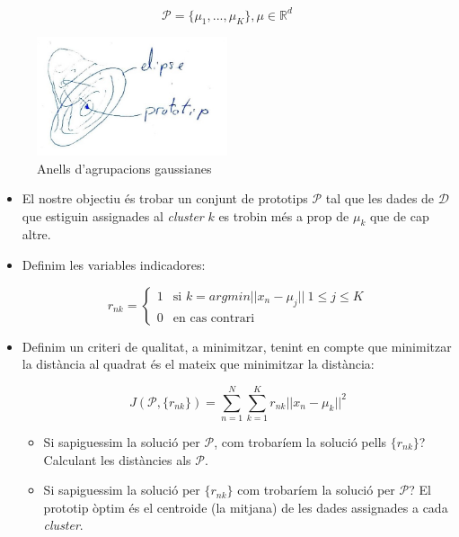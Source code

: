 \documentclass[a4paper]{article}
\begin{document}
$$ \mathcal{P} = \{ \mu_1, ..., \mu_K \}, \mu \in \mathbb{R}^d $$

\begin{figure}[H]
    \centering
    \includegraphics[width=0.5\textwidth]{figura_4}
    \caption{Anells d'agrupacions gaussianes}
\end{figure}

\begin{itemize}
	\item El nostre objectiu és trobar un conjunt de prototips $\mathcal{P}$ tal que les dades de $\mathcal{D}$ que estiguin assignades al \emph{cluster} $k$ es trobin més a prop de $\mu_k$ que de cap altre.
	\item Definim les variables indicadores:
	
	$$ r_{nk} =
	\begin{cases}
	1 & \text{si } k = argmin ||x_n - \mu_j||\ 1 \le j \le K \\ 0 & \text{en cas contrari}
	\end{cases}$$
	
	\item Definim un criteri de qualitat, a minimitzar, tenint en compte que minimitzar la distància al quadrat és el mateix que minimitzar la distància:
	
	$$ J(\mathcal{P}, \{r_{nk}\}) = \sum_{n=1}^N \sum_{k=1}^K r_{nk} ||x_n - \mu_k||^2 $$
	
	\begin{itemize}
		\item Si sapiguessim la solució per $\mathcal{P}$, com trobaríem la solució pells $\{r_{nk}\}$? Calculant les distàncies als $\mathcal{P}$.
		
		\item Si sapiguessim la solució per $\{r_{nk}\}$ com trobaríem la solució per $\mathcal{P}$? El prototip òptim és el centroide (la mitjana) de les dades assignades a cada \emph{cluster}.
	\end{itemize}
\end{itemize}
\end{document}
